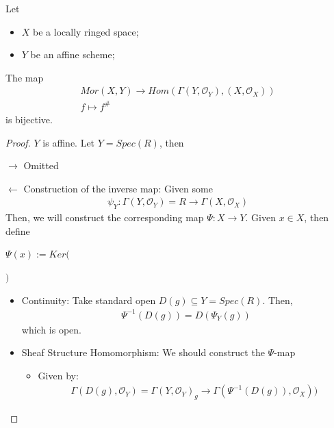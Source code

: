 \documentclass[Total.tex]{subfiles}
\begin{document}
			\begin{theorem}
				Let \label{Algebraic-Geometry-Affine-Schemes-Morphisms-from-Locally-Ringed-Space-to-Affine-Scheme}
				\begin{itemize}
					\item $X$ be a locally ringed space;
					\item $Y$ be an affine scheme;
				\end{itemize}
				The map
				\begin{gather*}
					Mor(X,Y)\rightarrow Hom(\Gamma(Y,\mathcal{O}_Y),(X,\mathcal{O}_X))\\
					f\mapsto f^\#
				\end{gather*}
				is bijective.
			\end{theorem}
			
			\begin{proof}
				$Y$ is affine. Let $Y=Spec(R)$, then 
				
				$\rightarrow$ Omitted
				
				$\leftarrow$ Construction of the inverse map: Given some 
				\begin{gather*}
					\psi_Y:\Gamma(Y,\mathcal{O}_Y)=R\rightarrow \Gamma(X,\mathcal{O}_X)
				\end{gather*}
				Then, we will construct the corresponding map $\Psi:X\rightarrow Y$. Given $x\in X$, then define
				\begin{center}
					$\Psi(x):=Ker($$)$
				\end{center}
				\begin{itemize}
					\item Continuity: Take standard open $D(g)\subseteq Y=Spec(R)$. Then, 
					\begin{gather*}
						\Psi^{-1}(D(g))=D(\Psi_Y(g))
					\end{gather*}
					which is open.
					
					\item Sheaf Structure Homomorphism: We should construct the $\Psi$-map 
					\begin{itemize}
						\item Given by:
						\begin{gather*}
							\Gamma(D(g),\mathcal{O}_Y)=\Gamma(Y,\mathcal{O}_Y)_g\rightarrow \Gamma(\Psi^{-1}(D(g)),\mathcal{O}_X))
						\end{gather*}
						

\end{itemize}
\end{itemize}
\end{proof}
\end{document}
